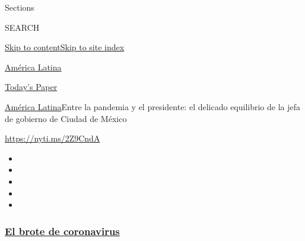 Sections

SEARCH

\protect\hyperlink{site-content}{Skip to
content}\protect\hyperlink{site-index}{Skip to site index}

\href{https://www.nytimes3xbfgragh.onion/es/section/america-latina}{América
Latina}

\href{https://myaccount.nytimes3xbfgragh.onion/auth/login?response_type=cookie\&client_id=vi}{}

\href{https://www.nytimes3xbfgragh.onion/section/todayspaper}{Today's
Paper}

\href{/es/section/america-latina}{América Latina}\textbar{}Entre la
pandemia y el presidente: el delicado equilibrio de la jefa de gobierno
de Ciudad de México

\url{https://nyti.ms/2Z9CndA}

\begin{itemize}
\item
\item
\item
\item
\item
\end{itemize}

\hypertarget{el-brote-de-coronavirus}{%
\subsubsection{\texorpdfstring{\href{https://www.nytimes3xbfgragh.onion/es/spotlight/coronavirus?name=styln-coronavirus-es\&region=TOP_BANNER\&block=storyline_menu_recirc\&action=click\&pgtype=Article\&impression_id=aa591640-f2bc-11ea-a620-0defd8f835ac\&variant=undefined}{El
brote de
coronavirus}}{El brote de coronavirus}}\label{el-brote-de-coronavirus}}

